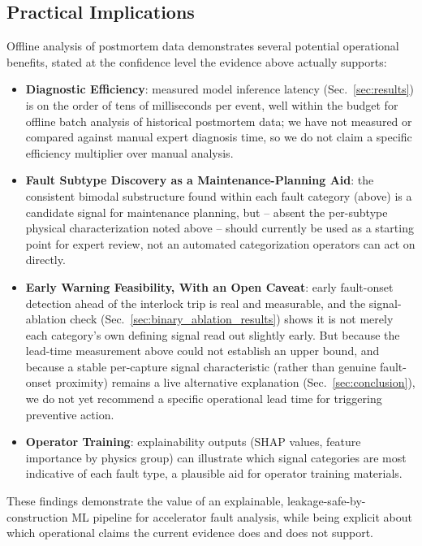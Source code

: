 \subsection{Practical Implications}

Offline analysis of postmortem data demonstrates several potential operational benefits, stated at the confidence level the evidence above actually supports:

\begin{itemize}
    \item \textbf{Diagnostic Efficiency}: measured model inference latency (Sec.~\ref{sec:results}) is on the order of tens of milliseconds per event, well within the budget for offline batch analysis of historical postmortem data; we have not measured or compared against manual expert diagnosis time, so we do not claim a specific efficiency multiplier over manual analysis.

    \item \textbf{Fault Subtype Discovery as a Maintenance-Planning Aid}: the consistent bimodal substructure found within each fault category (above) is a candidate signal for maintenance planning, but -- absent the per-subtype physical characterization noted above -- should currently be used as a starting point for expert review, not an automated categorization operators can act on directly.

    \item \textbf{Early Warning Feasibility, With an Open Caveat}: early fault-onset detection ahead of the interlock trip is real and measurable, and the signal-ablation check (Sec.~\ref{sec:binary_ablation_results}) shows it is not merely each category's own defining signal read out slightly early. But because the lead-time measurement above could not establish an upper bound, and because a stable per-capture signal characteristic (rather than genuine fault-onset proximity) remains a live alternative explanation (Sec.~\ref{sec:conclusion}), we do not yet recommend a specific operational lead time for triggering preventive action.

    \item \textbf{Operator Training}: explainability outputs (SHAP values, feature importance by physics group) can illustrate which signal categories are most indicative of each fault type, a plausible aid for operator training materials.
\end{itemize}

These findings demonstrate the value of an explainable, leakage-safe-by-construction ML pipeline for accelerator fault analysis, while being explicit about which operational claims the current evidence does and does not support.

